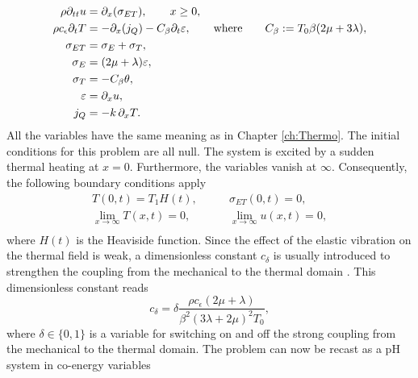 \begin{equation}
\begin{aligned}
\displaystyle \rho \partial_{tt} u &= \partial_x ({\sigma}_{ET}), \qquad x\ge 0,  \\
\displaystyle \rho c_\epsilon \partial_{t} T &= -\partial_x(j_Q) - {C}_\beta \partial_t \varepsilon, \qquad \text{where} \qquad {C}_\beta:=T_0 \beta(2\mu + 3\lambda),\\
{\sigma}_{ET} &= {\sigma}_E + {\sigma}_{T}, \\
{\sigma}_E &= (2\mu + \lambda) \varepsilon , \\
{\sigma}_T &= - {C}_\beta \theta,  \\
{\varepsilon} &= \partial_x u, \\
{j}_Q &= -k \, \partial_x T.
\end{aligned}
\end{equation}
All the variables have the same meaning as in Chapter \ref{ch:Thermo}. The initial conditions for this problem are all null. The system is excited by a sudden thermal heating at $x=0$. Furthermore, the variables vanish at $\infty$. Consequently, the following boundary conditions apply
\begin{equation*}
\begin{aligned}
T(0, t) = T_1 H(t), \\
\lim_{x \rightarrow \infty} T(x, t) = 0, \\
\end{aligned} \qquad 
\begin{aligned}
\sigma_{ET}(0, t) = 0, \\
\lim_{x \rightarrow \infty} u(x, t) = 0, \\
\end{aligned}
\end{equation*}
where $H(t)$ is the Heaviside function. Since the effect of the elastic vibration on the thermal field is weak, a dimensionless constant $c_\delta$ is usually introduced to strengthen the coupling from the mechanical to the thermal domain \cite{rabizadeh2016}. This dimensionless constant reads 
\begin{equation}\label{eq:c_delta}
c_\delta = \delta \frac{\rho c_\epsilon (2 \mu + \lambda)}{\beta^2 (3 \lambda + 2 \mu)^2 T_0},
\end{equation}
where $\delta \in \{0, 1\}$ is a variable for switching on and off the strong coupling from the mechanical to the thermal domain. The problem can now be recast as a pH system in co-energy variables
